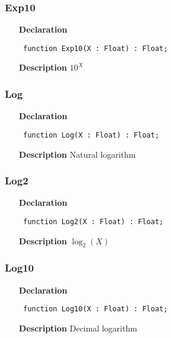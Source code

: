 \documentclass[12pt,a4paper,oneside]{report}
\newcommand{\declarationitem}[1]{\textbf{#1}}
\newcommand{\descriptiontitle}[1]{\textbf{#1}}
\newcommand{\code}[1]{\texttt{#1}}
\begin{document}
\subsubsection{Exp10}
\label{umath-Exp10}
\begin{itemize}\item[\declarationitem{Declaration}\hfill]
	\begin{flushleft}
		\code{
			function Exp10(X : Float) : Float;}
		
	\end{flushleft}
	
	\par
	\item[\descriptiontitle{Description}]
	$10^X$
	
\end{itemize}
\subsubsection{Log}
\label{umath-Log}
\begin{itemize}\item[\declarationitem{Declaration}\hfill]
	\begin{flushleft}
		\code{
			function Log(X : Float) : Float;}
		
	\end{flushleft}
	
	\par
	\item[\descriptiontitle{Description}]
	Natural logarithm
	
\end{itemize}
\subsubsection{Log2}
\label{umath-Log2}
\begin{itemize}\item[\declarationitem{Declaration}\hfill]
	\begin{flushleft}
		\code{
			function Log2(X : Float) : Float;}
		
	\end{flushleft}
	
	\par
	\item[\descriptiontitle{Description}]
	$\log_2(X)$
	
\end{itemize}
\subsubsection{Log10}
\label{umath-Log10}
\begin{itemize}\item[\declarationitem{Declaration}\hfill]
	\begin{flushleft}
		\code{
			function Log10(X : Float) : Float;}
		
	\end{flushleft}
	
	\par
	\item[\descriptiontitle{Description}]
	Decimal logarithm
	
\end{itemize}
\end{document}
